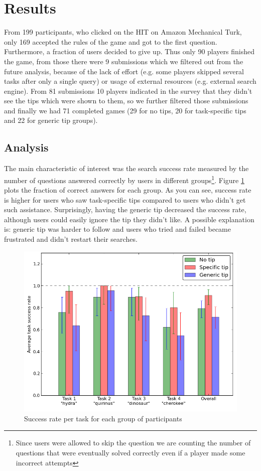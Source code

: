 \documentclass{sig-alternate}
\begin{document}
\section{Results}
From 199 participants, who clicked on the HIT on Amazon Mechanical Turk, only 169 accepted the rules of the game and got to the first question.
Furthermore, a fraction of users decided to give up.
Thus only 90 players finished the game, from those there were 9 submissions which we filtered out from the future analysis, because
of the lack of effort (e.g. some players skipped several tasks after only a single query) or usage of external resources (e.g. external search engine).
From 81 submissions 10 players indicated in the survey that they didn't see the tips which were shown to them, so we further filtered those submissions and finally we had 71 completed games (29 for no tips, 20 for task-specific tips and 22 for generic tip groups).


\subsection{Analysis}

The main characteristic of interest was the search success rate measured by the number of questions answered correctly by users in different groups\footnote{Since users were allowed to skip the question we are counting the number of questions that were eventually solved correctly even if a player made some incorrect attempts}.
Figure \ref{figure:task_success} plots the fraction of correct answers for each group.
As you can see, success rate is higher for users who saw task-specific tips compared to users who didn't get such assistance.
Surprisingly, having the generic tip decreased the success rate, although users could easily ignore the tip they didn't like.
A possible explanation is: generic tip was harder to follow and users who tried and failed became frustrated and didn't restart their searches.

\begin{figure}[ht]
\centering
\includegraphics[scale=0.4]{img/success_per_task}
\caption{Success rate per task for each group of participants}
\label{figure:task_success}
\end{figure}
\end{document}
